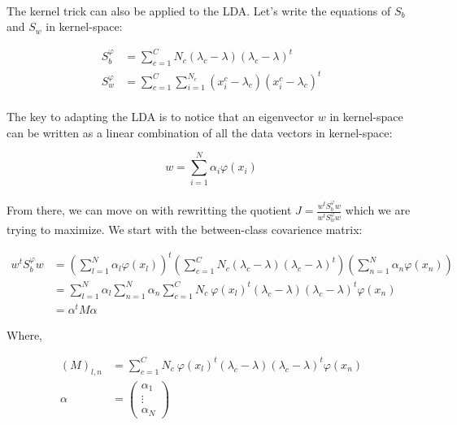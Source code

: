 \paragraph{}
The kernel trick can also be applied to the LDA. Let's write the equations of $S_b$ and $S_w$ in kernel-space:

\begin{align*}
S_b^\varphi &= \sum_{c = 1}^C N_c(\lambda_c - \lambda)(\lambda_c - \lambda)^t \\
S_w^\varphi &= \sum_{c = 1}^{C}\sum_{i = 1}^{N_c} (x_i^c - \lambda_c)(x_i^c - \lambda_c)^t
\end{align*}

\paragraph{}
The key to adapting the LDA is to notice that an eigenvector $w$ in kernel-space can be written as a
linear combination of all the data vectors in kernel-space:

\begin{equation}
\label{eq:phibase}
w = \sum_{i=1}^N \alpha_i \varphi(x_i)
\end{equation}

\paragraph{}
From there, we can move on with rewritting the quotient $J = \frac{w^tS_b^\varphi w}{w^tS_w^\varphi w}$ which we are
trying to maximize. We start with the between-class covarience matrix:

\begin{align*}
w^tS_b^\varphi w &= \left( \sum_{l=1}^N \alpha_l \varphi(x_l)\right)^t
            \left( \sum_{c=1}^C N_c(\lambda_c - \lambda)(\lambda_c - \lambda)^t\right)
            \left( \sum_{n=1}^N \alpha_n \varphi(x_n)\right) \\
&= \sum_{l=1}^N\alpha_l \sum_{n=1}^N \alpha_n \sum_{c =1}^C
                N_c ~\varphi(x_l)^t(\lambda_c - \lambda)(\lambda_c - \lambda)^t\varphi(x_n) \\
                &= \alpha^tM\alpha
\end{align*}

Where,

\begin{align*}
(M)_{l,n} &= \sum_{c=1}^C N_c ~\varphi(x_l)^t (\lambda_c - \lambda)(\lambda_c -\lambda)^t \varphi(x_n) \\
\alpha &= \left( \begin{array}{c}
                                \alpha_1 \\
                                \vdots \\
                                \alpha_N
                  \end{array}  \right) 
\end{align*}


